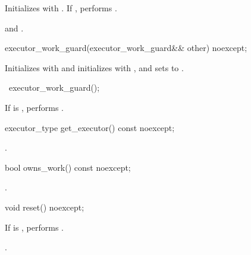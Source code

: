 \begin{itemdescr}
\pnum
\effects Initializes  with . If , performs .

\pnum
\postconditions {} and .
\end{itemdescr}

%
\begin{itemdecl}
executor_work_guard(executor_work_guard&& other) noexcept;
\end{itemdecl}

\begin{itemdescr}
\pnum
\effects Initializes  with 
and initializes  with ,
and sets  to .
\end{itemdescr}

%
\begin{itemdecl}
~executor_work_guard();
\end{itemdecl}

\begin{itemdescr}
\pnum
\effects If  is , performs .
\end{itemdescr}

%
\begin{itemdecl}
executor_type get_executor() const noexcept;
\end{itemdecl}

\begin{itemdescr}
\pnum
\returns {}.
\end{itemdescr}

%
\begin{itemdecl}
bool owns_work() const noexcept;
\end{itemdecl}

\begin{itemdescr}
\pnum
\returns {}.
\end{itemdescr}

%
\begin{itemdecl}
void reset() noexcept;
\end{itemdecl}

\begin{itemdescr}
\pnum
\effects If  is , performs .

\pnum
\postconditions {}.
\end{itemdescr}




